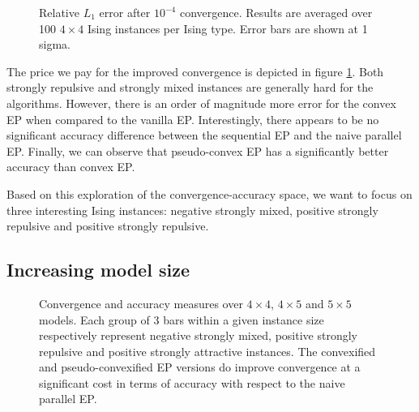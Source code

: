 \documentclass[times, 10pt,twocolumn]{article}
\begin{document}
\begin{figure}[h!]
	\caption{Relative $L_1$ error after $10^{-4}$ convergence. Results are averaged over 100 $4 \times 4$ Ising instances per Ising type. Error bars are shown at 1 sigma.}
	\label{44acc}
\end{figure}

The price we pay for the improved convergence is depicted in figure \ref{44acc}. Both strongly repulsive and strongly mixed instances are generally hard for the algorithms. However, there is an order of magnitude more error for the convex EP when compared to the vanilla EP. Interestingly, there appears to be no significant accuracy difference between the sequential EP and the naive parallel EP. Finally, we can observe that pseudo-convex EP has a significantly better accuracy than convex EP.

Based on this exploration of the convergence-accuracy space, we want to focus on three interesting Ising instances: negative strongly mixed, positive strongly repulsive and positive strongly repulsive.

\subsection{Increasing model size}
\begin{figure}[ht!]\centering
	\caption{Convergence and accuracy measures over $4 \times 4$, $4 \times 5$ and $5 \times 5$ models. Each group of 3 bars within a given instance size respectively represent negative strongly mixed, positive strongly repulsive and positive strongly attractive instances. The convexified and pseudo-convexified EP versions do improve convergence at a significant cost in terms of accuracy with respect to the naive parallel EP.}
	\label{444555}
\end{figure}
\end{document}
